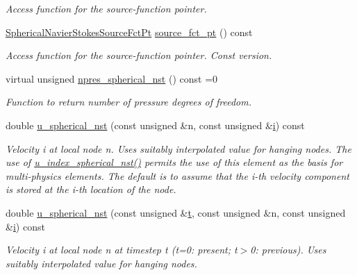 \begin{DoxyCompactItemize}
\begin{DoxyCompactList}\small\item\em Access function for the source-\/function pointer. \end{DoxyCompactList}\item 
\hyperlink{classoomph_1_1SphericalNavierStokesEquations_abd522fea532c3de15dbe80205e53bdf8}{Spherical\+Navier\+Stokes\+Source\+Fct\+Pt} \hyperlink{classoomph_1_1SphericalNavierStokesEquations_a380e3b8db32dbafbdd0a7a798b234be6}{source\+\_\+fct\+\_\+pt} () const
\begin{DoxyCompactList}\small\item\em Access function for the source-\/function pointer. Const version. \end{DoxyCompactList}\item 
virtual unsigned \hyperlink{classoomph_1_1SphericalNavierStokesEquations_ae01203564bc66dacf84c1ed65e4b7930}{npres\+\_\+spherical\+\_\+nst} () const =0
\begin{DoxyCompactList}\small\item\em Function to return number of pressure degrees of freedom. \end{DoxyCompactList}\item 
double \hyperlink{classoomph_1_1SphericalNavierStokesEquations_a51514fae13c21583c958157a75a943bc}{u\+\_\+spherical\+\_\+nst} (const unsigned \&n, const unsigned \&\hyperlink{cfortran_8h_adb50e893b86b3e55e751a42eab3cba82}{i}) const
\begin{DoxyCompactList}\small\item\em Velocity i at local node n. Uses suitably interpolated value for hanging nodes. The use of \hyperlink{classoomph_1_1SphericalNavierStokesEquations_a2f269e20874a87df919cc4ece4b05fe5}{u\+\_\+index\+\_\+spherical\+\_\+nst()} permits the use of this element as the basis for multi-\/physics elements. The default is to assume that the i-\/th velocity component is stored at the i-\/th location of the node. \end{DoxyCompactList}\item 
double \hyperlink{classoomph_1_1SphericalNavierStokesEquations_ad51d5e5080680802ad1ee5daab91765d}{u\+\_\+spherical\+\_\+nst} (const unsigned \&\hyperlink{cfortran_8h_af6f0bd3dc13317f895c91323c25c2b8f}{t}, const unsigned \&n, const unsigned \&\hyperlink{cfortran_8h_adb50e893b86b3e55e751a42eab3cba82}{i}) const
\begin{DoxyCompactList}\small\item\em Velocity i at local node n at timestep t (t=0\+: present; t$>$0\+: previous). Uses suitably interpolated value for hanging nodes. \end{DoxyCompactList}\item 

\end{DoxyCompactItemize}
